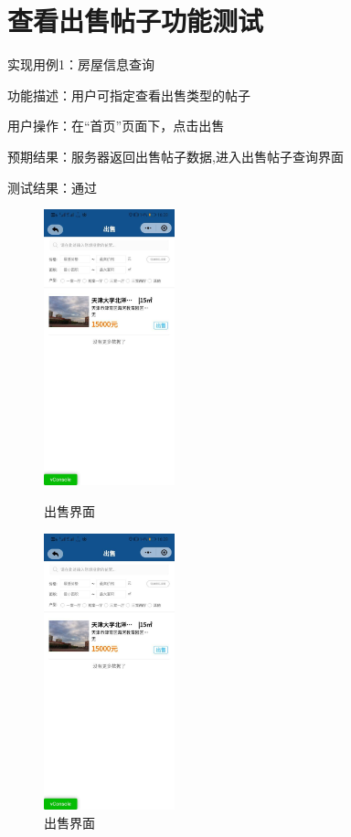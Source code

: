 \section{查看出售帖子功能测试}
实现用例1：房屋信息查询

功能描述：用户可指定查看出售类型的帖子

用户操作：在“首页”页面下，点击出售

预期结果：服务器返回出售帖子数据,进入出售帖子查询界面

测试结果：通过

\begin{figure}[htbp]
    \centering
    \begin{minipage}[t]{0.32\textwidth}
        \centering
        \includegraphics[width=3.8cm,height=8cm]{test/image/test11.png} 
       \caption{出售界面} 
        \end{minipage}
    \begin{minipage}[t]{0.32\textwidth}
    \centering
    \includegraphics[width=3.8cm,height=8cm]{test/image/test11.png} 
   \caption{出售界面} 

\end{minipage}
\end{figure}

